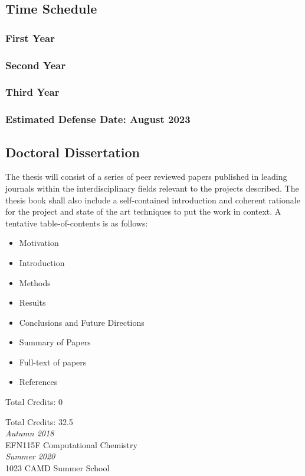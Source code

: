 \documentclass[a4paper,english]{article}
\def\centersec#1{\centering#1} %
\begin{document}
\subsection*{Time Schedule}
\subsubsection*{First Year}
\lipsum[28]{}
\subsubsection*{Second Year}
\lipsum[77]{}
\subsubsection*{Third Year}
\lipsum[63]{}

\subsubsection*{\centersec{Estimated Defense Date: August 2023}}

\subsection*{Doctoral Dissertation}
The thesis will consist of a series of peer reviewed papers published in leading journals within the interdisciplinary fields relevant to the projects described. The thesis book shall also include a self-contained introduction and coherent rationale for the project and state of the art techniques to put the work in context. A tentative table-of-contents is as follows:

\begin{itemize}[noitemsep]
  \item Motivation
  \item Introduction
  \item Methods
  \item Results
  \item Conclusions and Future Directions
  \item Summary of Papers
  \item Full-text of papers
  \item References
\end{itemize}

\begin{description}[itemsep=1pt]
  \item[Prerequisite courses:] Total Credits: 0
\item[Course Plan:] \quad Total Credits: 32.5 \\
  \hspace*{75pt} \textit{Autumn 2018} \\
  \hspace*{75pt} EFN115F Computational Chemistry \\
  \hspace*{75pt} \textit{Summer 2020} \\
  \hspace*{75pt} 1023 CAMD Summer School \\
\end{description}
\end{document}
